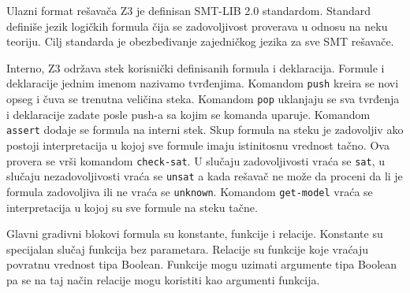 \documentclass[12pt,oneside]{memoir}
\newtheorem{primer}{Primer}
\begin{document}
\par
Ulazni format rešavača Z3 je definisan SMT-LIB 2.0 standardom. Standard definiše jezik logičkih formula čija se zadovoljivost proverava u odnosu na neku teoriju. Cilj standarda je obezbeđivanje zajedničkog jezika za sve SMT rešavače. 
\par
Interno, Z3 održava stek korisnički definisanih formula i deklaracija. Formule i deklaracije jednim imenom nazivamo tvrđenjima. Komandom \texttt{push} kreira se novi opseg i čuva se trenutna veličina steka. Komandom \texttt{pop} uklanjaju se sva tvrđenja i deklaracije zadate posle push-a sa kojim se komanda uparuje. Komandom \texttt{assert} dodaje se formula na interni stek. Skup formula na steku je zadovoljiv ako postoji interpretacija u kojoj sve formule imaju istinitosnu vrednost tačno. Ova provera se vrši komandom \texttt{check-sat}. U slučaju zadovoljivosti vraća se \texttt{sat}, u slučaju nezadovoljivosti vraća se \texttt{unsat} a kada rešavač ne može da proceni da li je formula zadovoljiva ili ne vraća se \texttt{unknown}. Komandom \texttt{get-model} vraća se interpretacija u kojoj su sve formule na steku tačne. 
\par
Glavni gradivni blokovi formula su konstante, funkcije i relacije. Konstante su specijalan slučaj funkcija bez parametara. Relacije su funkcije koje vraćaju povratnu vrednost tipa Boolean. Funkcije mogu uzimati argumente tipa Boolean pa se na taj način relacije mogu koristiti kao argumenti funkcija.  



\end{document}
